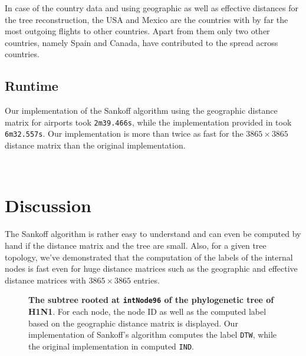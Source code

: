 \documentclass{article}
\begin{document}
In case of the country data and using geographic as well as effective distances for the tree reconstruction, the USA and Mexico are the countries with by far the most outgoing flights to other countries. Apart from them only two other countries, namely Spain and Canada, have contributed to the spread across countries.

\subsection{Runtime}
Our implementation of the Sankoff algorithm using the geographic distance
matrix for airports took \texttt{2m39.466s}, while the implementation provided in
\cite{reimeringPhylogeographicReconstructionUsing2020} took \texttt{6m32.557s}.
Our implementation is more than twice as fast for the $3865 \times 3865$
distance matrix than the original implementation.

\ \\
\section{Discussion}
The Sankoff algorithm is rather easy to understand and can even be computed by
hand if the distance matrix and the tree are small. Also, for a given tree
topology, we've demonstrated that the computation of the labels of the internal
nodes is fast even for huge distance matrices such as the geographic and
effective distance matrices with $3865 \times 3865$ entries.

\begin{figure}[h]
    \centering
    \caption{\textbf{The subtree rooted at \texttt{intNode96} of the
    phylogenetic tree of H1N1}. For each node, the node ID as well as the computed
    label based on the geographic distance matrix is displayed. Our implementation of Sankoff's algorithm computes the
    label \texttt{DTW}, while the original implementation in
    \cite{reimeringPhylogeographicReconstructionUsing2020} computed \texttt{IND}.}
    \label{fig:subtree}
  \end{figure}
\end{document}
